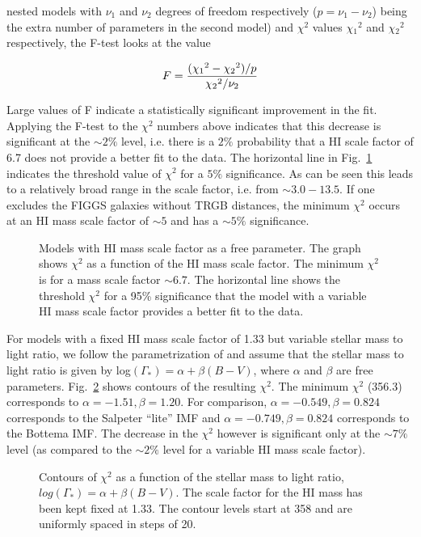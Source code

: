 \documentclass[useAMS,usenatbib]{mn2e}
\begin{document}
nested models with $\nu{_1}$ and $\nu_{2}$ degrees of freedom respectively ($p=\nu{_1}-\nu{_2}$) being the extra number of parameters in the second model) and $\chi^2$ values $\chi{_1}^2$  and $\chi{_2}^2$ respectively, the F-test looks at the value 

$$ F = {{(\chi{_1}^2 - \chi{_2}^2)/p} \over \chi{_2}^2/\nu_{2}} $$

Large values of F indicate a statistically significant improvement in the fit. Applying the F-test to the $\chi^2$ numbers above indicates that this decrease is significant at the $\sim 2\%$ level, i.e. there is a $2\%$ probability that a HI scale factor of 6.7 does not provide a better fit to the data. The horizontal line in Fig.~\ref{fig:mhi_scale} indicates the threshold value of $\chi^2$ for a $5\%$ significance. As can be seen this leads to a relatively broad range in the scale factor, i.e. from $\sim 3.0 - 13.5$. If one excludes the FIGGS galaxies without TRGB distances, the minimum $\chi^2$ occurs at an HI mass scale factor of $\sim 5$ and has a 
$\sim 5\%$ significance.

\begin{figure}
\caption{Models with HI mass scale factor as a free parameter. The graph shows $\chi^2$ as a function of the HI mass scale factor. The minimum $\chi^2$ is for a mass scale factor $\sim 6.7$. The horizontal line shows the threshold $\chi^2$ for a 95\% significance that the model with a variable HI mass scale factor provides a better fit to the data.}
\label{fig:mhi_scale}
\end{figure}

      For models with a fixed HI mass scale factor of 1.33 but variable stellar mass to light ratio, we follow the parametrization of \cite{bell03} and assume that the stellar mass to light ratio is given by log$(\Gamma_{*}) = \alpha + \beta (B-V)$, where $\alpha$ and $\beta$ are free parameters. Fig.~\ref{fig:imf_scale} shows contours of the resulting $\chi^2$. The minimum $\chi^2$ (356.3) corresponds to $\alpha = -1.51, \beta = 1.20$. For comparison, $\alpha = -0.549, \beta = 0.824$ corresponds to the Salpeter ``lite'' IMF and $\alpha = -0.749, \beta = 0.824$ corresponds to the Bottema IMF. The decrease in the $\chi^2$ however is significant only at the $\sim 7\%$ level (as compared to the $\sim 2\%$ level for a variable HI mass scale factor).

\begin{figure}
\caption{Contours of $\chi^2$ as a function of the stellar mass to light ratio, $log(\Gamma_{*}) = \alpha + \beta (B-V)$. The scale factor for the HI mass has been kept fixed at 1.33. The contour
levels start at 358 and are uniformly spaced in steps of 20.}
\label{fig:imf_scale}
\end{figure}
\end{document}
